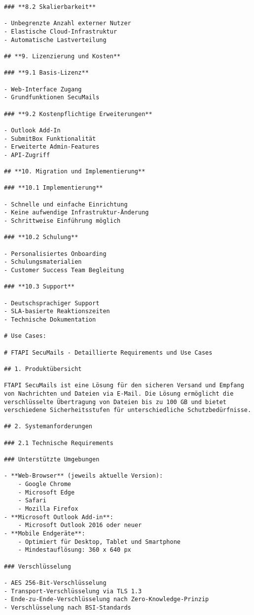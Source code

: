 \begin{Verbatim}[breaklines=true]
### **8.2 Skalierbarkeit**

- Unbegrenzte Anzahl externer Nutzer
- Elastische Cloud-Infrastruktur
- Automatische Lastverteilung

## **9. Lizenzierung und Kosten**

### **9.1 Basis-Lizenz**

- Web-Interface Zugang
- Grundfunktionen SecuMails

### **9.2 Kostenpflichtige Erweiterungen**

- Outlook Add-In
- SubmitBox Funktionalität
- Erweiterte Admin-Features
- API-Zugriff

## **10. Migration und Implementierung**

### **10.1 Implementierung**

- Schnelle und einfache Einrichtung
- Keine aufwendige Infrastruktur-Änderung
- Schrittweise Einführung möglich

### **10.2 Schulung**

- Personalisiertes Onboarding
- Schulungsmaterialien
- Customer Success Team Begleitung

### **10.3 Support**

- Deutschsprachiger Support
- SLA-basierte Reaktionszeiten
- Technische Dokumentation

# Use Cases:

# FTAPI SecuMails - Detaillierte Requirements und Use Cases

## 1. Produktübersicht

FTAPI SecuMails ist eine Lösung für den sicheren Versand und Empfang von Nachrichten und Dateien via E-Mail. Die Lösung ermöglicht die verschlüsselte Übertragung von Dateien bis zu 100 GB und bietet verschiedene Sicherheitsstufen für unterschiedliche Schutzbedürfnisse.

## 2. Systemanforderungen

### 2.1 Technische Requirements

### Unterstützte Umgebungen

- **Web-Browser** (jeweils aktuelle Version):
    - Google Chrome
    - Microsoft Edge
    - Safari
    - Mozilla Firefox
- **Microsoft Outlook Add-in**:
    - Microsoft Outlook 2016 oder neuer
- **Mobile Endgeräte**:
    - Optimiert für Desktop, Tablet und Smartphone
    - Mindestauflösung: 360 x 640 px

### Verschlüsselung

- AES 256-Bit-Verschlüsselung
- Transport-Verschlüsselung via TLS 1.3
- Ende-zu-Ende-Verschlüsselung nach Zero-Knowledge-Prinzip
- Verschlüsselung nach BSI-Standards


\end{Verbatim}
